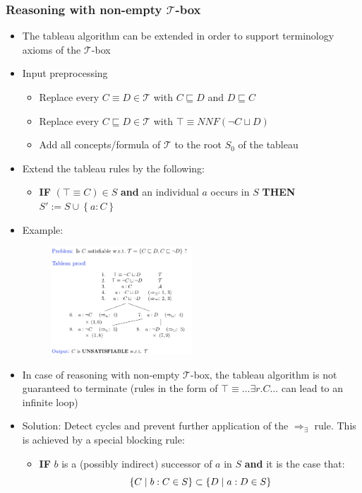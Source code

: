 \subsubsection{Reasoning with non-empty $\mathcal{T}$-box}
\begin{itemize}
	\item The tableau algorithm can be extended in order to support terminology axioms of the $\mathcal{T}$-box
	\item Input preprocessing
	\begin{itemize}
		\item Replace every $C\equiv D \in \mathcal{T}$ with $C\sqsubseteq D$ and $D\sqsubseteq C$
		\item Replace every $C\sqsubseteq D \in \mathcal{T}$ with $\top \equiv NNF(\lnot C \sqcup D)$
		\item Add all concepts/formula of $\mathcal{T}$ to the root $S_0$ of the tableau
	\end{itemize}
	\item Extend the tableau rules by the following:
	\begin{itemize}
		\item \textbf{IF} $(\top \equiv C) \in S$ \textbf{and} an individual $a$ occurs in $S$ \textbf{THEN} $S' := S\cup\left\{a:C\right\}$
	\end{itemize}
	\item Example:
	\begin{figure}[ht!]
		\hspace{10mm}
		\includegraphics[width=0.5\textwidth]{figures/kr_dl_tableau_nonempty_tbox_example.png}
	\end{figure}
	\item In case of reasoning with non-empty $\mathcal{T}$-box, the tableau algorithm is not guaranteed to terminate (rules in the form of $\top\equiv ...\exists r.C...$ can lead to an infinite loop)
	\item Solution: Detect cycles and prevent further application of the $\Rightarrow_{\exists}$ rule. This is achieved by a special blocking rule:
	\begin{itemize}
		\item \textbf{IF} $b$ is a (possibly indirect) successor of $a$ in $S$ \textbf{and} it is the case that: $$\left\{C\hspace{1mm}|\hspace{1mm} b:C \in S\right\} \subset \left\{D\hspace{1mm}|\hspace{1mm} a:D \in S\right\} $$
		

\end{itemize}
\end{itemize}
